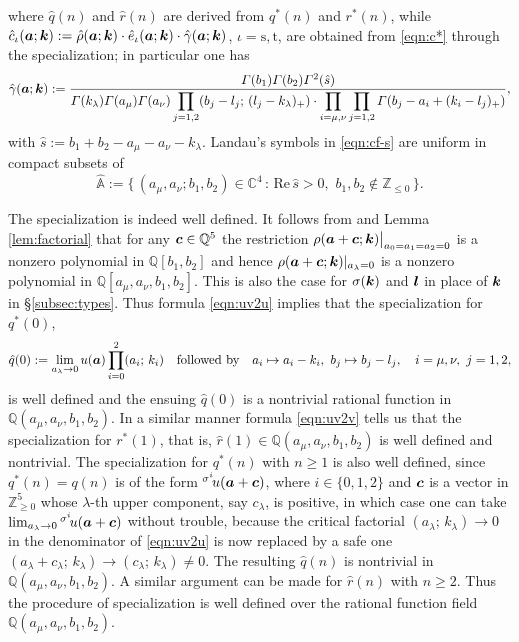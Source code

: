 \documentclass[a4paper,12pt]{article}
\theoremstyle{plain}
\def\rs{\mathrm{s}}
\def\rt{\mathrm{t}}
\def\rRe{\mathrm{Re}}
\def\A{\mathbb{A}}
\def\C{\mathbb{C}}
\def\Q{\mathbb{Q}}
\def\Z{\mathbb{Z}}
\def\vG{\varGamma}
\def\ba{\mbox{\boldmath $a$}}
\def\bc{\mbox{\boldmath $c$}}
\def\bk{\mbox{\boldmath $k$}}
\def\bl{\mbox{\boldmath $l$}}
\def\ds{\displaystyle}
\begin{document}
where $\hat{q}(n)$ and $\hat{r}(n)$ are derived from $q^*(n)$ and $r^*(n)$,  
while $\hat{c}_{\iota}(\ba; \bk) := \hat{\rho}(\ba; \bk) \cdot 
\hat{e}_{\iota}(\ba; \bk) \cdot \hat{\gamma}(\ba; \bk)$, $\iota = \rs, \rt$,    
are obtained from \eqref{eqn:c*} through the specialization; in particular one has    
\[
\hat{\gamma}(\ba; \bk) :=  
\frac{\vG(b_1) \vG(b_2) \vG^2(\hat{s})}{\vG(k_{\lambda}) 
\vG(a_{\mu}) \vG(a_{\nu}) 
\ds \prod_{j=1,2} (b_j-l_j; \, (l_j-k_{\lambda})_+) \cdot 
\prod_{i = \mu, \nu} \prod_{j=1,2} \vG(b_j-a_i + (k_i-l_j)_+) }, 
\]
with $\hat{s} := b_1+b_2-a_{\mu}-a_{\nu}-k_{\lambda}$. 
Landau's symbols in \eqref{eqn:cf-s} are uniform in compact subsets of 
\[
\hat{\A} := \{\, (a_{\mu}, a_{\nu}; b_1, b_2) \in \C^4 \,:\, \rRe \, \hat{s} > 0, \, \, 
b_1, b_2 \not \in \Z_{\le 0} \, \}. 
\]
\par
The specialization is indeed well defined. 
It follows from \cite[Proposition 4.9]{EI} and Lemma \ref{lem:factorial} that 
for any $\bc \in \Q^5$ the restriction 
$\rho(\ba+\bc; \bk) \big|_{a_0 = a_1 = a_2 = 0}$ is a nonzero polynomial in 
$\Q[b_1, b_2]$ and hence $\rho(\ba+\bc; \bk)|_{a_{\lambda} = 0}$ is a 
nonzero polynomial in $\Q[a_{\mu}, a_{\nu}, b_1, b_2]$. 
This is also the case for $\sigma(\bk)$ and $\bl$ in place of $\bk$ in 
\S \ref{subsec:types}. 
Thus formula \eqref{eqn:uv2u} implies that the specialization for $q^*(0)$, 
\[
\hat{q}(0) := \lim_{a_{\lambda} \to 0} u(\ba) \prod_{i=0}^2 (a_i; \, k_i) 
\quad \mbox{followed by} \quad a_i \mapsto a_i - k_i, \,\, 
b_j \mapsto b_j - l_j, \quad i = \mu, \nu, \,\, j = 1, 2,    
\] 
is well defined and the ensuing $\hat{q}(0)$ is a nontrivial rational function 
in $\Q(a_{\mu}, a_{\nu}, b_1, b_2)$. 
In a similar manner formula \eqref{eqn:uv2v} tells us that the specialization 
for $r^*(1)$, that is, $\hat{r}(1) \in \Q(a_{\mu}, a_{\nu}, b_1, b_2)$ is  
well defined and nontrivial. 
The specialization for $q^*(n)$ with $n \ge 1$ is also well defined,  
since $q^*(n) = q(n)$ is of the form ${}^{\sigma^i} \! u(\ba + \bc)$, where 
$i \in \{0,1,2\}$ and $\bc$ is a vector in $\Z_{\ge 0}^5$ whose 
$\lambda$-th upper component, say $c_{\lambda}$, is positive, in which case 
one can take $\lim_{a_{\lambda} \to 0} {}^{\sigma^i} \! u(\ba + \bc)$ 
without trouble, because the critical factorial 
$(a_{\lambda}; \, k_{\lambda}) \to 0$ in the denominator of 
\eqref{eqn:uv2u} is now replaced by a safe one 
$(a_{\lambda}+ c_{\lambda}; \, k_{\lambda}) \to 
(c_{\lambda}; \, k_{\lambda}) \neq 0$. 
The resulting $\hat{q}(n)$ is nontrivial in $\Q(a_{\mu}, a_{\nu}, b_1, b_2)$.  
A similar argument can be made for $\hat{r}(n)$ with $n \ge 2$. 
Thus the procedure of specialization is well defined over the rational function 
field $\Q(a_{\mu}, a_{\nu}, b_1, b_2)$.        
\end{document}
